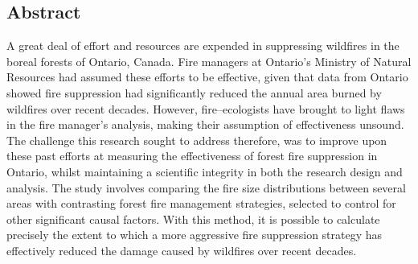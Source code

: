 \begin{spacing}{1.5}
\phantom
\phantom
\phantom
\phantom
\section*{Abstract}
\phantom
\phantom
A great deal of effort and resources are expended in suppressing wildfires in the boreal forests of Ontario, Canada. Fire managers at Ontario's Ministry of Natural Resources had assumed these efforts to be effective, given that data from Ontario showed fire suppression had significantly reduced the annual area burned by wildfires over recent decades. However, fire--ecologists have brought to light flaws in the fire manager's analysis, making their assumption of effectiveness unsound. \\

\noindent The challenge this research sought to address therefore, was to improve upon these past efforts at measuring the effectiveness of forest fire suppression in Ontario, whilst maintaining a scientific integrity in both the research design and analysis. The study involves comparing the fire size distributions between several areas with contrasting forest fire management strategies, selected to control for other significant causal factors. With this method, it is possible to calculate precisely the extent to which a more aggressive fire suppression strategy has effectively reduced the damage caused by wildfires over recent decades. \\




\end{spacing}
\clearpage
